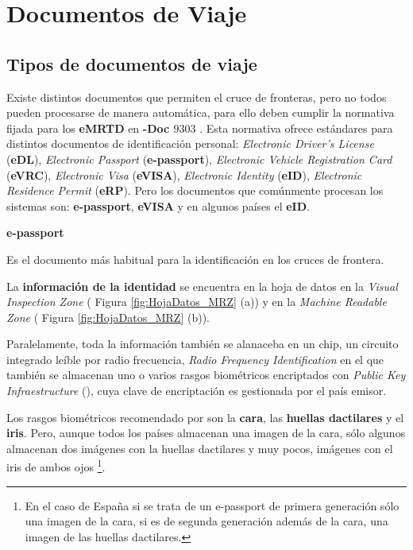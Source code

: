 \chapter{Documentos de Viaje}\label{apendix:DocDeViaje}

\section{Tipos de documentos de viaje}\label{subsec:TiposDocumentosDeViaje}

Existe distintos documentos que permiten el cruce de fronteras, pero no todos pueden procesarse de manera automática, para ello deben cumplir la normativa fijada para los \textbf{\gls{eMRTD}} en \textbf{-Doc $9303$} \cite{doc20069303}. Esta normativa ofrece estándares para distintos documentos de identificación personal: \textit{Electronic Driver's License} (\textbf{\gls{eDL}}), \textit{Electronic Passport} (\textbf{\gls{e-passport}}), \textit{Electronic Vehicle Registration Card} (\textbf{\gls{eVRC}}), \textit{Electronic Visa} (\textbf{\gls{eVISA}}), \textit{Electronic Identity} (\textbf{\gls{eID}}), \textit{Electronic Residence Permit} (\textbf{\gls{eRP}}). Pero los documentos que comúnmente procesan los sistemas  son: \textbf{\gls{e-passport}}, \textbf{\gls{eVISA}} y en algunos países el \textbf{\gls{eID}}.

\medskip
\textbf{\gls{e-passport}}

Es el documento más habitual para la identificación en los cruces de frontera.

La \textbf{información de la identidad} se encuentra en la hoja de datos en la \textit{Visual Inspection Zone} (\textbf{} Figura \ref{fig:HojaDatos_MRZ} (a)) y en la \textit{Machine Readable Zone} (\textbf{} Figura \ref{fig:HojaDatos_MRZ} (b)).

Paralelamente, toda la información también se alanaceba en un chip, un circuito integrado leíble por radio frecuencia, \textit{Radio Frequency Identification} \textbf{} en el que también se almacenan uno o varios rasgos biométricos encriptados con \textit{Public Key Infraestructure} (\textbf{}), cuya clave de encriptación es gestionada por el país emisor.

Los rasgos biométricos recomendado por  son la \textbf{cara}, las \textbf{huellas dactilares} y el \textbf{\gls{iris}}. Pero, aunque todos los países almacenan una imagen de la cara, sólo algunos almacenan dos imágenes con la huellas dactilares y muy pocos, imágenes con el \gls{iris} de ambos ojos \footnote{En el caso de España si se trata de un \gls{e-passport} de primera generación sólo una imagen de la cara, si es de segunda generación además de la cara, una imagen de las huellas dactilares.}. 

